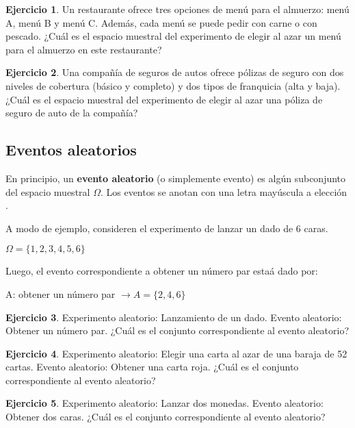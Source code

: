 \documentclass[
]{book}
\theoremstyle{definition}
\theoremstyle{definition}
\theoremstyle{definition}
\newtheorem{exercise}{Ejercicio}[chapter]
\theoremstyle{definition}
\theoremstyle{remark}
\begin{document}
\begin{exercise}
Un restaurante ofrece tres opciones de menú para el almuerzo: menú A, menú B y menú C. Además, cada menú se puede pedir con carne o con pescado. ¿Cuál es el espacio muestral del experimento de elegir al azar un menú para el almuerzo en este restaurante?
\end{exercise}

\begin{exercise}
Una compañía de seguros de autos ofrece pólizas de seguro con dos niveles de cobertura (básico y completo) y dos tipos de franquicia (alta y baja). ¿Cuál es el espacio muestral del experimento de elegir al azar una póliza de seguro de auto de la compañía?
\end{exercise}

\hypertarget{eventos-aleatorios}{%
\subsection{Eventos aleatorios}\label{eventos-aleatorios}}

En principio, un \textbf{evento aleatorio} (o simplemente evento) es algún subconjunto del espacio muestral \(\Omega\). Los eventos se anotan con una letra mayúscula a elección \citep[página 153]{anderson}.

A modo de ejemplo, consideren el experimento de lanzar un dado de 6 caras.

\(\Omega = \lbrace 1,2,3,4,5,6 \rbrace\)

Luego, el evento correspondiente a obtener un número par estaá dado por:

A: obtener un número par \(\rightarrow A = \lbrace 2,4,6 \rbrace\)

\begin{exercise}
Experimento aleatorio: Lanzamiento de un dado. Evento aleatorio: Obtener un número par. ¿Cuál es el conjunto correspondiente al evento aleatorio?
\end{exercise}

\begin{exercise}
Experimento aleatorio: Elegir una carta al azar de una baraja de 52 cartas. Evento aleatorio: Obtener una carta roja. ¿Cuál es el conjunto correspondiente al evento aleatorio?
\end{exercise}

\begin{exercise}
Experimento aleatorio: Lanzar dos monedas. Evento aleatorio: Obtener dos caras. ¿Cuál es el conjunto correspondiente al evento aleatorio?
\end{exercise}
\end{document}
